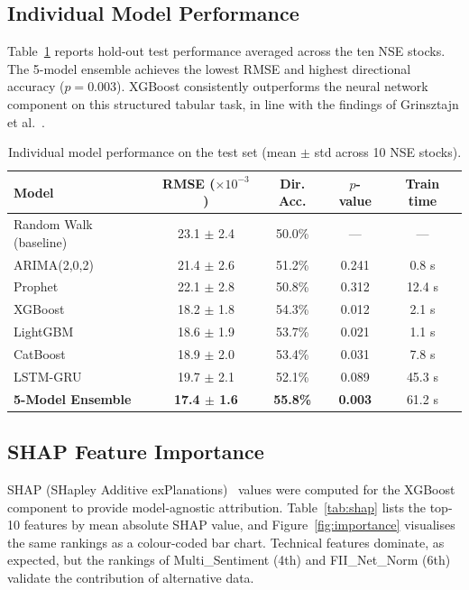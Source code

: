 \documentclass[10pt,a4paper,twoside]{article}
\begin{document}
\subsection{Individual Model Performance}

Table~\ref{tab:model_perf} reports hold-out test performance averaged across
the ten NSE stocks. The 5-model ensemble achieves the lowest RMSE and highest
directional accuracy ($p = 0.003$). XGBoost consistently outperforms the
neural network component on this structured tabular task, in line with the
findings of Grinsztajn et al.~\cite{grinsztajn2022}.

\begin{table}[htb]
  \begin{center}
    {\caption{Individual model performance on the test set (mean $\pm$ std across
    10 NSE stocks).}\label{tab:model_perf}}
    \begin{tabular}{|l|c|c|c|c|}
    \hline
    \textbf{Model} & \textbf{RMSE ($\times 10^{-3}$)} & \textbf{Dir. Acc.} & \textbf{$p$-value} & \textbf{Train time} \\
    \hline
    Random Walk (baseline) & 23.1 $\pm$ 2.4 & 50.0\% & --- & --- \\
    ARIMA(2,0,2) & 21.4 $\pm$ 2.6 & 51.2\% & 0.241 & 0.8 s \\
    Prophet & 22.1 $\pm$ 2.8 & 50.8\% & 0.312 & 12.4 s \\
    XGBoost & 18.2 $\pm$ 1.8 & 54.3\% & 0.012 & 2.1 s \\
    LightGBM & 18.6 $\pm$ 1.9 & 53.7\% & 0.021 & 1.1 s \\
    CatBoost & 18.9 $\pm$ 2.0 & 53.4\% & 0.031 & 7.8 s \\
    LSTM-GRU & 19.7 $\pm$ 2.1 & 52.1\% & 0.089 & 45.3 s \\
    \textbf{5-Model Ensemble} & \textbf{17.4 $\pm$ 1.6} & \textbf{55.8\%} & \textbf{0.003} & 61.2 s \\
    \hline
    \end{tabular}
  \end{center}
\end{table}

\subsection{SHAP Feature Importance}

SHAP (SHapley Additive exPlanations)~\cite{lundberg2017} values were computed
for the XGBoost component to provide model-agnostic attribution.
Table~\ref{tab:shap} lists the top-10 features by mean absolute SHAP value,
and Figure~\ref{fig:importance} visualises the same rankings as a colour-coded
bar chart. Technical features dominate, as expected, but the rankings of
Multi\_Sentiment (4th) and FII\_Net\_Norm (6th) validate the contribution of
alternative data.
\end{document}
